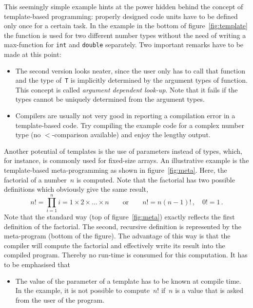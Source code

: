 This seemingly simple example hints at the power hidden behind the
concept of template-based programming: properly designed code
units have to be defined only once for a certain task.  In the
example in the bottom of figure~\ref{fig:template} the function is
used for two different number types without the need of writing a
max-function for \texttt{int} and \texttt{double} separately.  Two
important remarks have to be made at this point:
\begin{itemize}
\item The second version looks neater, since the user only has to call
  that function and the type of~\texttt{T} is implicitly determined by
  the argument types of function. This concept is called
  \emph{argument dependent look-up}. Note that it fails if the types
  cannot be uniquely determined from the argument types.
\item Compilers are usually not very good in reporting a compilation
  error in a template-based code. Try compiling the example code for a
  complex number type (no $<$-comparison available) and enjoy the
  lengthy output.
\end{itemize}

Another potential of templates is the use of parameters instead of
types, which, for instance, is commonly used for fixed-size arrays. An
illustrative example is the template-based meta-programming as shown
in figure~\ref{fig:meta}. Here, the factorial of a number~$n$ is
computed. Note that the factorial has two possible definitions which
obviously give the same result,
\begin{equation*}
  n! = \prod_{i=1}^n i = 1 \times 2 \times \dots \times n 
  \qquad \text{or} \qquad
  n! = n (n-1)!\,, \quad 0! = 1\,.
\end{equation*}
Note that the standard way (top of figure~\ref{fig:meta}) exactly
reflects the first definition of the factorial. The second, recursive
definition is represented by the meta-program (bottom of the figure).
The advantage of this way is that the compiler will compute the
factorial and effectively write its result into the compiled
program. Thereby no run-time is consumed for this computation. 
It has to be emphasised that
\begin{itemize}
\item The value of the parameter of a template has to be known at
  compile time. In the example, it is not possible to compute~$n!$
  if~$n$ is a value that is asked from the user of the program.
\end{itemize}

